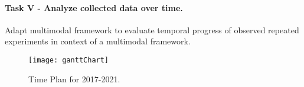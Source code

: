\paragraph{Task V - Analyze collected data over time.} Adapt multimodal framework to evaluate temporal progress of observed repeated experiments in context of a multimodal framework.


\begin{figure}
    \centering
    \texttt{[image: ganttChart]}
    \caption{Time Plan for 2017-2021.}
    \label{fig:timePlan}
\end{figure}






\begin{comment}
\textbf{Task 1- Research image features for RGB, depth, and infrared data that permit the mapping of visible facial muscle activity to correct/incorrect execution of speech exercises OR paralysis severity.} It is expected that by combining different modalities (RGB, depth, infrared) the feature representation of facial activity is improved. The goal is that the feature representation permits the binary classification of correct/incorrect execution of speech exercises in the case of applying to speech therapy. In the case of facial paralysis the goal is to have a feature representation that permits a multiclass classification for the degree of severity of the paralysis.\\

\textbf{Task 2 - Understand the relation ... engagement during exercises through detecting relevant facial expressions.} Speech therapy requires monotonous repetition of exercises which can affect the engagement of the patient. By detecting in real-time the disengagement of the patient, different exercises can be suggested to maintain a positive learning curve. \\

\textbf{Task 3 - Research feature spaces that relates in meaningfully manner information from different modalities, therapist annotations and time.}
Suuport the SLTs reasoning and exploration of health data. 
Additionally to visual features, therapist annotations will be used to represent the progress of the therapy over time. As the therapy is performed through several sessions the time component is essential to measure the progress of a patient. 

\textbf{Task 4 - Develop statistical model that suggests future exercises by comparing one patient with similar ones in an existing database.} By being able to model the temporal progress of the therapy, the progress of one patient can be compared to the progress of others. Patients with similar starting point and positive conclusion of the therapy, can be taken as example and can provide insights of therapeutic actions that can help other similar patients to improve their progress. Thus, future actions to take can be suggested to the therapist. This model could also be used for other applications where temporal progression of a disease is observed through several therapy sessions. 


\end{comment}





